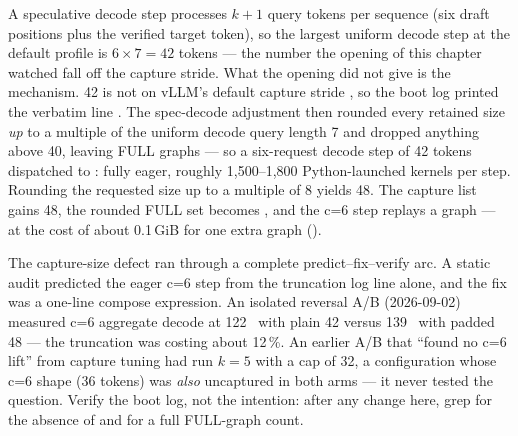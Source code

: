 A speculative decode step processes $k+1$ query tokens per sequence (six
draft positions plus the verified target token), so the largest uniform
decode step at the default profile is $6\times 7 = 42$ tokens --- the
number the opening of this chapter watched fall off the capture stride.
What the opening did not give is the mechanism. 42 is not on vLLM's default
capture stride \code{[1,2,4,8,16,24,32,40]}, so the boot log printed the
verbatim line . The
spec-decode adjustment then rounded every retained size \emph{up} to a
multiple of the uniform decode query length 7 and dropped anything above
40, leaving FULL graphs \code{[7,14,21,28,35]} --- so a six-request decode
step of 42 tokens dispatched to : fully eager,
roughly 1{,}500--1{,}800 Python-launched kernels per step. Rounding the
requested size up to a multiple of 8 yields 48. The capture list gains 48,
the rounded FULL set becomes \code{[7,14,21,28,35,42]}, and the c=6 step
replays a graph --- at the cost of about 0.1\,GiB for one extra graph
().

\begin{hblesson}
The capture-size defect ran through a complete predict--fix--verify arc. A
static audit predicted the eager c=6 step from the truncation log line
alone, and the fix was a one-line compose expression. An isolated reversal
A/B (2026-09-02) measured c=6 aggregate decode at 122~\tokspersec{} with plain 42 versus
139~\tokspersec{} with padded 48 --- the truncation was costing about 12\,\%. An
earlier A/B that ``found no c=6 lift'' from capture tuning had run $k{=}5$
with a cap of 32, a configuration whose c=6 shape (36 tokens) was \emph{also}
uncaptured in both arms --- it never tested the question. Verify the boot log,
not the intention: after any change here, grep for the absence of
 and for a full FULL-graph count.
\end{hblesson}

